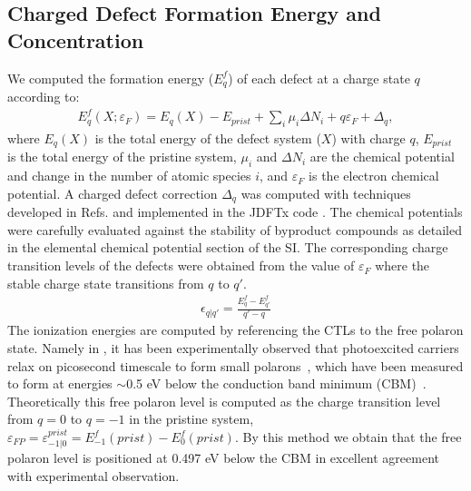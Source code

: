 \subsection{Charged Defect Formation Energy and Concentration}
We computed the formation energy ($E^f_q$) of each defect at a charge state $q$ according to:
\begin{align}
    E^f_q(X; \varepsilon_F) = E_q(X) - E_{prist} + \sum_i \mu_i \Delta N_i + q \varepsilon_F + \Delta_q,
    \label{eq:cfe}
\end{align}
where $E_q(X)$ is the total energy of the defect system ($X$) with charge $q$, $E_{prist}$ is the total energy of the pristine system, $\mu_i$ and $\Delta N_i$ are the chemical potential and change in the number of atomic species $i$, and $\varepsilon_F$ is the electron chemical potential. A charged defect correction $\Delta_q$ was computed with techniques developed in Refs. \cite{PING2017JCP, wu2017first} and implemented in the JDFTx code \cite{JDFTx}. The chemical potentials were carefully evaluated against the stability of byproduct compounds as detailed in the elemental chemical potential section of the SI.
The corresponding charge transition levels of the defects were obtained from the value of $\varepsilon_F$ where the stable charge state transitions from $q$ to $q'$.
\begin{align}
    \epsilon_{q|q'} = \frac{E^f_q - E^f_{q'}}{q' - q}
    \label{eq:ctl}
\end{align}
The ionization energies are computed by referencing the CTLs to the free polaron state.
\cite{seo2018role,radmilovic2020combined,zhou2020interstitial,lee2020electrochemical}
Namely in , it has been experimentally observed that photoexcited carriers relax on picosecond timescale to form small polarons~\cite{carneiro2017excitation}, which have been measured to form at energies $\sim$0.5 eV below the conduction band minimum (CBM)~\cite{lohaus2018limitation,pastor2019situ}. Theoretically this free polaron level is computed as the charge transition level from $q=0$ to $q=-1$ in the pristine system, $\varepsilon_{FP} = \varepsilon_{-1|0}^{prist} = E^f_{-1}(prist) - E^f_0(prist)$. By this method we obtain that the free polaron level is positioned at 0.497 eV below the CBM in excellent agreement with experimental observation.~\cite{lohaus2018limitation,pastor2019situ}

